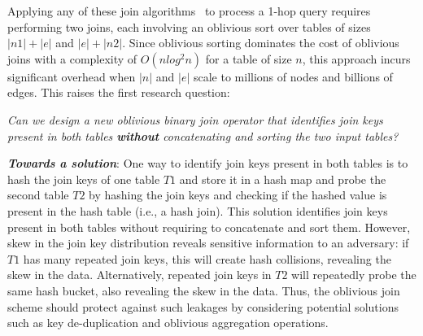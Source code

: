 Applying any of these join algorithms~\cite{zheng2017opaque, eskandarian2019oblidb, krastnikov2020efficient, mavrogiannakis2025obliviator} to process a 1-hop query requires performing two joins, each involving an oblivious sort over tables of sizes 
$|n1|+|e|$ and $|e|+|n2|$. Since oblivious sorting dominates the cost of oblivious joins with 
a complexity of $O(nlog^2n)$ for a table of size $n$, this approach incurs significant 
overhead when $|n|$ and $|e|$ scale to millions of nodes and billions of edges.
This raises the first research question:

\begin{tcolorbox}[colback=gray!7!white,coltitle=black,colframe=orange!50!white,title=\centering \textbf{Research question 1}]
\centering
\emph{Can we design a new oblivious binary join operator that identifies join
keys present in both tables \textbf{without} concatenating and sorting the two input tables?}
\end{tcolorbox}

\noindent\textit{\textbf{Towards a solution}}: One way to identify join keys
present in both tables is to hash the join keys of one table $T1$ and store it 
in a hash map and probe the second table $T2$ by hashing the join keys and checking if
the hashed value is present in the hash table (i.e., a hash join). This solution 
identifies join keys
present in both tables without requiring to concatenate and sort them. However, skew
in the join key distribution reveals sensitive information to an adversary:
if $T1$ has many repeated join keys, this will create hash collisions, revealing
the skew in the data. Alternatively, repeated join keys in $T2$ will repeatedly
probe the same hash bucket, also revealing the skew in the
data. Thus, the oblivious join scheme should protect against such leakages by
considering potential solutions such as key de-duplication and oblivious aggregation operations. 


